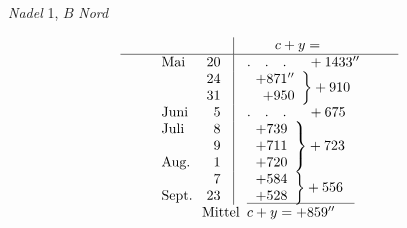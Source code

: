 \begin{center}\textit{Nadel} 1, $B$ \textit{Nord}\end{center}
\[
\begin{array}{@{\hspace{.085\linewidth}}lr@{\hspace{.027\linewidth}}|@{\hspace{.027\linewidth}}l@{\hspace{.08\linewidth}}}
&&\qquad c+y=\\\hline
\text{Mai}&20&.\quad.\quad.\hspace{1.5em}+1433''\\
&\begin{array}{@{}r@{}}24\\31\end{array}&\left.\begin{array}{r}+871''\\+950\end{array}\right\}+910\\
\text{Juni}&5&.\quad.\quad.\hspace{1.5em}+675\\
\begin{array}{@{}l@{}}\text{Juli}\\\phantom{\text{Juli}}\\\text{Aug.}\end{array}&\begin{array}{@{}r@{}}8\\9\\1\end{array}&\left.\begin{array}{r}+739\\+711\\+720\end{array}\right\}+723\\
\begin{array}{@{}l@{}}\phantom{\text{Aug.}}\\\text{Sept.}\end{array}&\begin{array}{@{}r@{}}7\\23\end{array}&\left.\begin{array}{r}+584\\+528\end{array}\right\}+556\\[3pt]
\multicolumn{2}{r@{\hspace{.015\linewidth}}}{\text{Mittel}}&\rlap{\raisebox{2.15ex}[0pt][0pt]{\rule{.223\linewidth}{.35pt}}}c+y=+859''
\end{array}
\]

